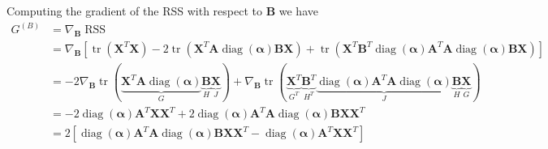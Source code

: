 \documentclass{article}
\begin{document}
Computing the gradient of the RSS with respect to $\mathbf{B}$ we have
\begin{equation}
    \label{eq:relaxed_objective_grad_B}
    \begin{aligned}
        G^{(B)} &= \nabla_{\mathbf{B}} \operatorname{RSS} \\
        &= \nabla_{\mathbf{B}}
        \left[
            \operatorname{tr}\left( \mathbf{X}^T \mathbf{X} \right)
            - 2 \operatorname{tr} \left( \mathbf{{X}}^T \mathbf{{A}} \operatorname{diag}(\boldsymbol{\alpha}) \mathbf{B} \mathbf{X} \right)
            + \operatorname{tr} \left( \mathbf{X}^T \mathbf{B}^T \operatorname{diag}(\boldsymbol{\alpha}) \mathbf{{A}}^T \mathbf{{A}} \operatorname{diag}(\boldsymbol{\alpha}) \mathbf{B} \mathbf{X} \right)
        \right] \\
        &=
            - 2 \nabla_{\mathbf{B}} \operatorname{tr}(\underbrace{\mathbf{{X}}^T \mathbf{{A}} \operatorname{diag}(\boldsymbol{\alpha})}_{G} \underbrace{\mathbf{B}}_{H} \underbrace{\mathbf{X}}_{J})
            + \nabla_{\mathbf{B}} \operatorname{tr}(\underbrace{\mathbf{X}^T}_{G^T} \underbrace{\mathbf{B}^T}_{H^T} \underbrace{\operatorname{diag}(\boldsymbol{\alpha}) \mathbf{{A}}^T \mathbf{{A}} \operatorname{diag}(\boldsymbol{\alpha})}_{J} \underbrace{\mathbf{B}}_{H} \underbrace{\mathbf{X}}_{G}) \\
        & =
            -2 \operatorname{diag}(\boldsymbol{\alpha}) \mathbf{{A}}^T \mathbf{{X}} \mathbf{X}^T
            +2 \operatorname{diag}(\boldsymbol{\alpha}) \mathbf{{A}}^T \mathbf{{A}} \operatorname{diag}(\boldsymbol{\alpha}) \mathbf{B} \mathbf{X} \mathbf{X}^T \\
        & = 2
        \left[
            \operatorname{diag}(\boldsymbol{\alpha}) \mathbf{{A}}^T \mathbf{{A}} \operatorname{diag}(\boldsymbol{\alpha}) \mathbf{B} \mathbf{X} \mathbf{X}^T
            - \operatorname{diag}(\boldsymbol{\alpha}) \mathbf{{A}}^T \mathbf{{X}} \mathbf{X}^T
        \right]
    \end{aligned}
\end{equation}
\end{document}
